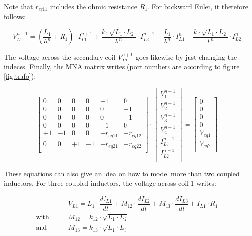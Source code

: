 Note that $r_{eq11}$ includes the ohmic resistance $R_1$. For backward
Euler, it therefore follows:

\begin{equation}
V_{L1}^{n+1} = \left(\dfrac{L_1}{h^n} + R_1 \right)\cdot I_{L1}^{n+1}
             + \dfrac{k\cdot\sqrt{L_1\cdot L_2}}{h^n}\cdot I_{L2}^{n+1}
             - \dfrac{L_1}{h^n}\cdot I_{L1}^n
             - \dfrac{k\cdot\sqrt{L_1\cdot L_2}}{h^n}\cdot I_{L2}^n
\end{equation}

The voltage across the secondary coil $V_{L2}^{n+1}$ goes likewise
by just changing the indeces. Finally, the MNA matrix writes
(port numbers are according to figure \ref{fig:trafo}):

\begin{equation}
\begin{bmatrix}
0 & 0 & 0 & 0 & +1 &  0\\
0 & 0 & 0 & 0 &  0 & +1\\
0 & 0 & 0 & 0 &  0 & -1\\
0 & 0 & 0 & 0 & -1 &  0\\
+1 & -1 & 0 & 0 & -r_{eq11} & -r_{eq12}\\
0 & 0 & +1 & -1 & -r_{eq21} & -r_{eq22}\\
\end{bmatrix}
\cdot
\begin{bmatrix}
V_1^{n+1}\\
V_2^{n+1}\\
V_3^{n+1}\\
V_4^{n+1}\\
I_{L1}^{n+1}\\
I_{L2}^{n+1}\\
\end{bmatrix}
=
\begin{bmatrix}
0\\
0\\
0\\
0\\
V_{eq1}\\
V_{eq2}\\
\end{bmatrix}
\end{equation}

These equations can also give an idea on how to model more than two
coupled inductors. For three coupled inductors, the voltage across
coil 1 writes:

\begin{align}
 & V_{L1} = L_1\cdot\dfrac{d I_{L1}}{d t} + M_{12}\cdot\dfrac{d I_{L2}}{d t}
          + M_{13}\cdot\dfrac{d I_{L3}}{d t} + I_{L1}\cdot R_1 \\
\text{with}\qquad & M_{12} = k_{12}\cdot\sqrt{L_1\cdot L_2} \\
\text{and}\qquad  & M_{13} = k_{13}\cdot\sqrt{L_1\cdot L_3} \\
\end{align}

